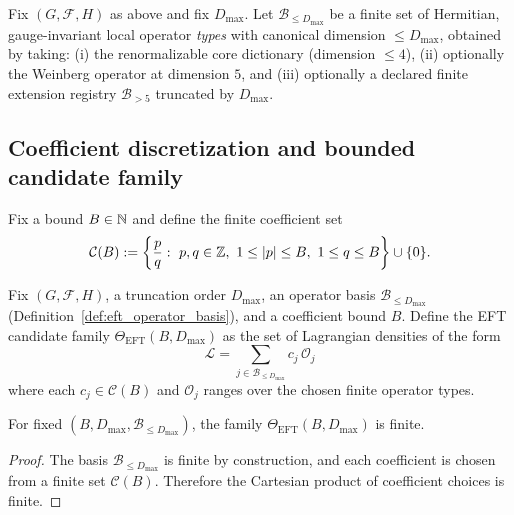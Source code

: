 \begin{definition}\label{def:eft_operator_basis}
\MathTag Fix $(G,\mathcal{F},H)$ as above and fix $D_{\max}$.
Let $\mathcal{B}_{\le D_{\max}}$ be a finite set of Hermitian, gauge-invariant local operator \emph{types} with canonical dimension $\le D_{\max}$, obtained by taking:
(i) the renormalizable core dictionary (dimension $\le 4$),
(ii) optionally the Weinberg operator at dimension $5$,
and (iii) optionally a declared finite extension registry $\mathcal{B}_{>5}$ truncated by $D_{\max}$.
\end{definition}

\subsection{Coefficient discretization and bounded candidate family}

\begin{definition}\label{def:eft_coeff_box}
\MathTag Fix a bound $B\in\mathbb{N}$ and define the finite coefficient set
\[
\mathcal{C}(B):=\left\{\frac{p}{q}:\ p,q\in\ZZ,\ 1\le |p|\le B,\ 1\le q\le B\right\}\cup\{0\}.
\]
\end{definition}

\begin{definition}\label{def:eft_candidate_family}
\MathTag Fix $(G,\mathcal{F},H)$, a truncation order $D_{\max}$, an operator basis $\mathcal{B}_{\le D_{\max}}$ (Definition~\ref{def:eft_operator_basis}), and a coefficient bound $B$.
Define the EFT candidate family $\Theta_{\mathrm{EFT}}(B,D_{\max})$ as the set of Lagrangian densities of the form
\[
\mathcal{L}=\sum_{j\in \mathcal{B}_{\le D_{\max}}} c_j\,\mathcal{O}_j
\]
where each $c_j\in\mathcal{C}(B)$ and $\mathcal{O}_j$ ranges over the chosen finite operator types.
\end{definition}

\begin{lemma}[Finiteness]\label{lem:eft_candidate_family_finite}
\MathTag For fixed $(B,D_{\max},\mathcal{B}_{\le D_{\max}})$, the family $\Theta_{\mathrm{EFT}}(B,D_{\max})$ is finite.
\end{lemma}
\begin{proof}
The basis $\mathcal{B}_{\le D_{\max}}$ is finite by construction, and each coefficient is chosen from a finite set $\mathcal{C}(B)$.
Therefore the Cartesian product of coefficient choices is finite.
\end{proof}

